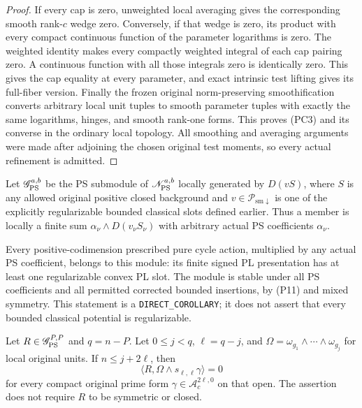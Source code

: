 \begin{proof}
If every cap is zero, unweighted local averaging gives
the corresponding smooth rank-$c$ wedge zero.
Conversely, if that wedge is zero, its product with every
compact continuous function of the parameter logarithms
is zero.  The weighted identity makes every compactly
weighted integral of each cap pairing zero.  A continuous
function with all those integrals zero is identically
zero.  This gives the cap equality at every parameter,
and exact intrinsic test lifting gives its full-fiber
version.  Finally the frozen original norm-preserving
smoothification converts arbitrary local unit tuples to
smooth parameter tuples with exactly the same logarithms,
hinges, and smooth rank-one forms.  This proves (PC3) and
its converse in the ordinary local topology.  All smoothing
and averaging arguments were made after adjoining the
chosen original test moments, so every actual refinement
is admitted.
\end{proof}

\begin{definition}
\label{def:r10-pws-curvature-generated}
Let $\mathscr G_{\rm PS}^{a,b}$ be the PS submodule of
$\mathscr N_{\rm PS}^{a,b}$ locally generated by
$D(vS)$, where $S$ is any allowed original positive closed
background and
$v\in\mathcal P_{\mathrm{sm}\downarrow}$ is one of the
explicitly regularizable bounded classical slots defined
earlier.  Thus a member is locally a finite sum
$\alpha_\nu\wedge D(v_\nu S_\nu)$ with arbitrary actual
PS coefficients $\alpha_\nu$.
\end{definition}

Every positive-codimension prescribed pure cycle action,
multiplied by any actual PS coefficient, belongs to this
module: its finite signed PL presentation has at least
one regularizable convex PL slot.  The module is stable
under all PS coefficients and all permitted corrected
bounded insertions, by (P11) and mixed symmetry.  This
statement is a \texttt{DIRECT\_COROLLARY}; it does not
assert that every bounded classical potential is
regularizable.

\begin{lemma}
\label{lem:r10-pws-generated-conormal-annihilation}
Let $R\in\mathscr G_{\rm PS}^{P,P}$ and $q=n-P$.
Let $0\le j<q$, $\ell=q-j$, and
$\Omega=\omega_{g_1}\wedge\cdots\wedge\omega_{g_j}$
for local original units.  If $n\le j+2\ell$, then
\[
                    \langle R,\Omega\wedge
                              s_{\ell,\ell}\gamma\rangle=0
 \tag{PC4}
\]
for every compact original prime form
$\gamma\in\mathscr A_c^{2\ell,0}$ on that open.
The assertion does not require $R$ to be symmetric or closed.
\end{lemma}

